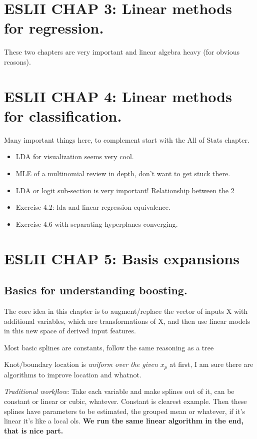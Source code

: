 \documentclass{article}
\begin{document}
\section{ESLII CHAP 3: Linear methods for regression.}
These two chapters are very important and linear algebra heavy (for obvious reasons).
\section{ESLII CHAP 4: Linear methods for classification.}
Many important things here, to complement start with the All of Stats chapter. 

\begin{itemize}
    \item LDA for visualization seems very cool.
    \item MLE of a multinomial review in depth, don't want to get stuck there.
    \item LDA or logit sub-section is very important! Relationship between the 2
    \item Exercise 4.2: lda and linear regression equivalence.
    \item Exercise 4.6 with separating hyperplanes converging.
\end{itemize}


\section{ESLII CHAP 5: Basis expansions}

\subsection{Basics for understanding boosting.}
The core idea in this chapter is to augment/replace the
vector of inputs X with additional variables, which are transformations of
X, and then use linear models in this new space of derived input features.

Most basic splines are constants, follow the same reasoning as a tree 

Knot/boundary location is \textit{uniform over the given $x_p$} at first, I am sure there are algorithms to improve location and whatnot.

\textit{Traditional workflow:}
Take each variable and make splines out of it, can be constant or linear or cubic, whatever. Constant is clearest example.
Then these splines have parameters to be estimated, the grouped mean or whatever, if it's linear it's like a local ols.
\textbf{We run the same linear algorithm in the end, that is nice part.}
\end{document}

